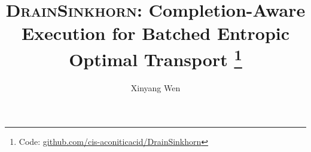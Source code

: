 \documentclass[10pt,twocolumn]{article}
\title{\textsc{DrainSinkhorn}: Completion-Aware Execution for Batched Entropic Optimal Transport%
\thanks{Code: \href{https://github.com/cis-aconiticacid/DrainSinkhorn}{github.com/cis-aconiticacid/DrainSinkhorn}}}
\author{Xinyang Wen}
\date{}
\begin{document}
\raggedbottom
\maketitle
\begin{abstract}

\end{abstract}








\FloatBarrier

\begingroup
\small


\endgroup

\clearpage
\onecolumn
\appendix

\end{document}
